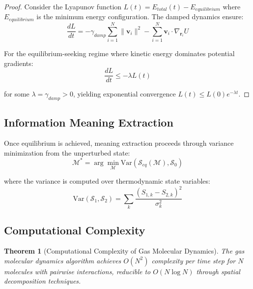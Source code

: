 \documentclass[11pt,a4paper]{article}
\newtheorem{theorem}{Theorem}[section]
\begin{document}
\begin{proof}
Consider the Lyapunov function $L(t) = E_{total}(t) - E_{equilibrium}$ where $E_{equilibrium}$ is the minimum energy configuration. The damped dynamics ensure:
\begin{equation}
\frac{dL}{dt} = -\gamma_{damp} \sum_{i=1}^{N} \|\mathbf{v}_i\|^2 - \sum_{i=1}^{N} \mathbf{v}_i \cdot \nabla_{\mathbf{r}_i} U
\end{equation}

For the equilibrium-seeking regime where kinetic energy dominates potential gradients:
\begin{equation}
\frac{dL}{dt} \leq -\lambda L(t)
\end{equation}

for some $\lambda = \gamma_{damp} > 0$, yielding exponential convergence $L(t) \leq L(0) e^{-\lambda t}$.
\end{proof}

\subsection{Information Meaning Extraction}

Once equilibrium is achieved, meaning extraction proceeds through variance minimization from the unperturbed state:
\begin{equation}
\mathcal{M}^* = \arg\min_{\mathcal{M}} \text{Var}(\mathcal{S}_{eq}(\mathcal{M}), \mathcal{S}_0)
\label{eq:meaning-extraction}
\end{equation}

where the variance is computed over thermodynamic state variables:
\begin{equation}
\text{Var}(\mathcal{S}_1, \mathcal{S}_2) = \sum_{k} \frac{(S_{1,k} - S_{2,k})^2}{\sigma_k^2}
\label{eq:thermodynamic-variance}
\end{equation}

\subsection{Computational Complexity}

\begin{theorem}[Computational Complexity of Gas Molecular Dynamics]
The gas molecular dynamics algorithm achieves $O(N^2)$ complexity per time step for $N$ molecules with pairwise interactions, reducible to $O(N \log N)$ through spatial decomposition techniques.
\end{theorem}
\end{document}
